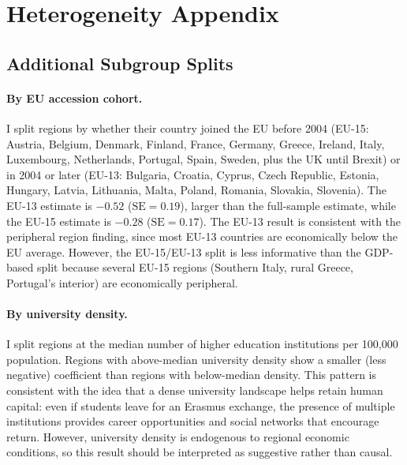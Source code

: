 \documentclass[12pt]{article}
\begin{document}
\section{Heterogeneity Appendix}
\label{sec:app_heterogeneity}

\subsection{Additional Subgroup Splits}

\paragraph{By EU accession cohort.} I split regions by whether their country joined the EU before 2004 (EU-15: Austria, Belgium, Denmark, Finland, France, Germany, Greece, Ireland, Italy, Luxembourg, Netherlands, Portugal, Spain, Sweden, plus the UK until Brexit) or in 2004 or later (EU-13: Bulgaria, Croatia, Cyprus, Czech Republic, Estonia, Hungary, Latvia, Lithuania, Malta, Poland, Romania, Slovakia, Slovenia). The EU-13 estimate is $-0.52$ ($\text{SE} = 0.19$), larger than the full-sample estimate, while the EU-15 estimate is $-0.28$ ($\text{SE} = 0.17$). The EU-13 result is consistent with the peripheral region finding, since most EU-13 countries are economically below the EU average. However, the EU-15/EU-13 split is less informative than the GDP-based split because several EU-15 regions (Southern Italy, rural Greece, Portugal's interior) are economically peripheral.

\paragraph{By university density.} I split regions at the median number of higher education institutions per 100,000 population. Regions with above-median university density show a smaller (less negative) coefficient than regions with below-median density. This pattern is consistent with the idea that a dense university landscape helps retain human capital: even if students leave for an Erasmus exchange, the presence of multiple institutions provides career opportunities and social networks that encourage return. However, university density is endogenous to regional economic conditions, so this result should be interpreted as suggestive rather than causal.
\end{document}
